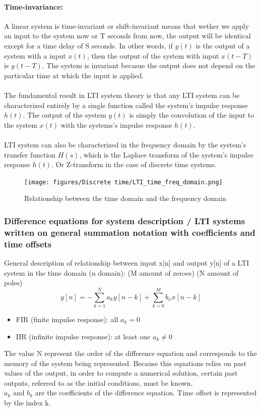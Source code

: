 \documentclass{article}
\begin{document}
\paragraph{Time-invariance:} 
A linear system is time-invariant or shift-invariant means that wether we apply an input to the system now or T seconds from now, the output will be identical except for a time delay of S seconds. In other words, if $y(t)$ is the output of a system with a input $x(t)$, then the output of the system with input $x(t-T)$ is $y(t-T)$. The system is invariant becasue the output does not depend on the particular time at which the input is applied.
\\
\\
The fundamental result in LTI system theory is that any LTI system can be characterized entirely by a single function called the system's impulse response $h(t)$. The output of the system $y(t)$ is simply the convolution of the input to the system $x(t)$ with the systems's impulse response $h(t)$.
\\
\\
LTI system can also be characterized in the frequency domain by the system's transfer function $H(s)$, which is the Laplace transform of the system's impulse response $h(t)$. Or Z-transform in the case of discrete time systems.
\begin{figure}[h!]
    \centering
    \texttt{[image: figures/Discrete time/LTI\_time\_freq\_domain.png]}
    \caption{Relationship between the time domain and the frequency domain}
    \label{fig:lti_relationship}
\end{figure}

\subsubsection{Difference equations for system description / LTI systems written on general summation notation with coefficients and time offsets} %
General description of relationship between input x[n] and output y[n] of a LTI system in the time domain (n domain): (M amount of zeroes) (N amount of poles)
\begin{equation}
    y[n] = -\sum_{k=1}^{N}a_ky[n-k] + \sum_{k=0}^{M}b_xx[n-k]
\end{equation}
\begin{itemize}
    \item FIR (finite impulse response): all $a_k = 0$
    \item IIR (infinite impulse response): at least one $a_k \neq 0$
\end{itemize}
The value N represent the order of the difference equation and corresponds to the memory of the system being represented. Because this equations relies on past values of the output, in order to compute a numerical solution, certain past outputs, referred to as the initial conditions, must be known.
\\
\textbf{$a_k$} and \textbf{$b_k$} are the coefficients of the difference equation. 
Time offset is represented by the index k.
\end{document}
